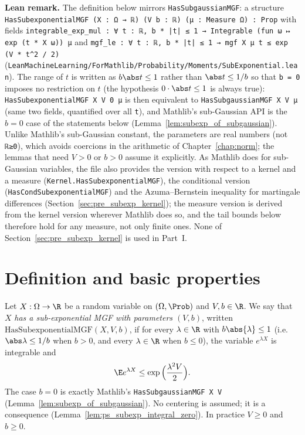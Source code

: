 \textbf{Lean remark.} The definition below mirrors \texttt{HasSubgaussianMGF}: a structure
\texttt{HasSubexponentialMGF (X : Ω → ℝ) (V b : ℝ) (μ : Measure Ω) : Prop} with fields
\texttt{integrable\_exp\_mul : ∀ t : ℝ, b * |t| ≤ 1 → Integrable (fun ω ↦ exp (t * X ω)) μ} and
\texttt{mgf\_le : ∀ t : ℝ, b * |t| ≤ 1 → mgf X μ t ≤ exp (V * t\^{}2 / 2)}
(\texttt{LeanMachineLearning/ForMathlib/Probability/Moments/SubExponential.lean}). The range of $t$ is
written as $b\abs t\le1$ rather than $\abs t\le1/b$ so that \texttt{b = 0} imposes no
restriction on $t$ (the hypothesis $0\cdot\abs t\le1$ is always true):
\texttt{HasSubexponentialMGF X V 0 μ} is then equivalent to \texttt{HasSubgaussianMGF X V μ}
(same two fields, quantified over all \texttt{t}), and Mathlib's sub-Gaussian API is the
$b = 0$ case of the statements below (Lemma~\ref{lem:subexp_of_subgaussian}). Unlike
Mathlib's sub-Gaussian constant, the parameters are real numbers (not \texttt{ℝ≥0}), which
avoids coercions in the arithmetic of Chapter~\ref{chap:norm}; the lemmas that need $V > 0$
or $b > 0$ assume it explicitly. As Mathlib does for sub-Gaussian variables, the file also
provides the version with respect to a kernel and a measure
(\texttt{Kernel.HasSubexponentialMGF}), the conditional version
(\texttt{HasCondSubexponentialMGF}) and the Azuma--Bernstein inequality for martingale
differences (Section~\ref{sec:pre_subexp_kernel}); the measure version is derived from the
kernel version wherever Mathlib does so, and the tail bounds below therefore hold for any
measure, not only finite ones. None of Section~\ref{sec:pre_subexp_kernel} is used in Part~I.

\section{Definition and basic properties}
\label{sec:pre_subexp_def}

\begin{definition}\label{def:subexp}
\leanok
Let $X : \Omega \to \R$ be a random variable on $(\Omega,\Prob)$ and $V, b \in \R$. We say
that $X$ \emph{has a sub-exponential MGF with parameters $(V,b)$}, written
$\mathrm{HasSubexponentialMGF}(X, V, b)$, if for every $\lambda \in \R$ with
$b\abs{\lambda} \le 1$ (i.e.\ $\abs\lambda\le1/b$ when $b>0$, and every $\lambda\in\R$ when
$b \le 0$), the variable $e^{\lambda X}$ is integrable and
\[
  \E e^{\lambda X} \le \exp\Big(\frac{\lambda^2V}{2}\Big).
\]
The case $b = 0$ is exactly Mathlib's \texttt{HasSubgaussianMGF X V}
(Lemma~\ref{lem:subexp_of_subgaussian}). No centering is assumed; it is a consequence
(Lemma~\ref{lem:ps_subexp_integral_zero}). In practice $V \ge 0$ and $b \ge 0$.
\end{definition}

